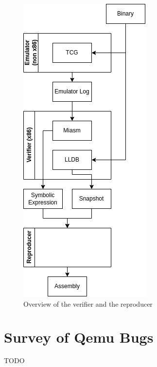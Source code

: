 \begin{figure}[ht]
   \centering
   \includegraphics[width=0.4\linewidth]{figures/ver_and_rep_1}
   \caption{Overview of the verifier and the reproducer}
   \label{fig:ver_and_rep_1}
\end{figure}

\section{Survey of Qemu Bugs}
TODO
